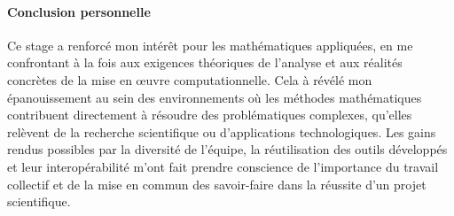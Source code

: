\paragraph*{Conclusion personnelle}\label{par:cc3}
Ce stage a renforcé mon intérêt pour les mathématiques appliquées, 
en me confrontant à la fois aux exigences théoriques de l'analyse et aux réalités concrètes de la mise en œuvre computationnelle.
Cela à révélé mon épanouissement au sein des environnements où les méthodes mathématiques contribuent directement à résoudre des problématiques complexes, 
qu'elles relèvent de la recherche scientifique ou d'applications technologiques.
Les gains rendus possibles par la diversité de l'équipe, 
la réutilisation des outils développés et leur interopérabilité m'ont fait prendre conscience
de l'importance du travail collectif et de la mise en commun des savoir-faire dans la réussite d'un projet scientifique.

